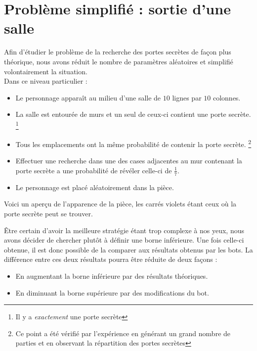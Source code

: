 \documentclass[a4paper,12pt]{article}
\begin{document}
\section{Problème simplifié : sortie d'une salle}

Afin d'étudier le problème de la recherche des portes secrètes de façon plus
théorique, nous avons réduit le nombre de paramètres aléatoires et simplifié
volontairement la situation.
\\
Dans ce niveau particulier :
\begin{itemize}
\item Le personnage apparaît au milieu d'une salle de $10$ lignes par $10$
  colonnes.
\item La salle est entourée de murs et un seul de ceux-ci contient une porte
  secrète.
  \footnote{Il y a {\em exactement} une porte secrète}
\item Tous les emplacements ont la même probabilité de contenir la porte
  secrète.
  \footnote{Ce point a été vérifié par l'expérience en générant un grand nombre
    de parties et en observant la répartition des portes secrètes}
\item Effectuer une recherche dans une des cases adjacentes au mur contenant la
  porte secrète a une probabilité de révéler celle-ci de $\frac{1}{7}$.
\item Le personnage est placé aléatoirement dans la pièce.
\end{itemize}

Voici un aperçu de l'apparence de la pièce, les carrés violets étant ceux où la
porte secrète peut se trouver.

\begin{center}
\end{center}

Être certain d'avoir la meilleure stratégie étant trop complexe à nos yeux, nous
avons décider de chercher plutôt à définir une borne inférieure. Une fois
celle-ci obtenue, il est donc possible de la comparer aux résultats obtenus par
les bots. La différence entre ces deux résultats pourra être réduite de deux
façons :
\begin{itemize}
\item En augmentant la borne inférieure par des résultats théoriques.
\item En diminuant la borne supérieure par des modifications du bot.
\end{itemize}
\end{document}
